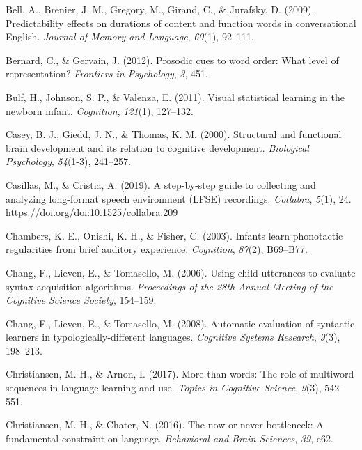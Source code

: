 \documentclass[
  english,
  man,floatsintext]{apa6}
\begin{document}
\leavevmode\hypertarget{ref-bell2009predictability}{}%
Bell, A., Brenier, J. M., Gregory, M., Girand, C., \& Jurafsky, D. (2009). Predictability effects on durations of content and function words in conversational English. \emph{Journal of Memory and Language}, \emph{60}(1), 92--111.

\leavevmode\hypertarget{ref-bernard2012prosodic}{}%
Bernard, C., \& Gervain, J. (2012). Prosodic cues to word order: What level of representation? \emph{Frontiers in Psychology}, \emph{3}, 451.

\leavevmode\hypertarget{ref-bulf2011visual}{}%
Bulf, H., Johnson, S. P., \& Valenza, E. (2011). Visual statistical learning in the newborn infant. \emph{Cognition}, \emph{121}(1), 127--132.

\leavevmode\hypertarget{ref-casey2000structural}{}%
Casey, B. J., Giedd, J. N., \& Thomas, K. M. (2000). Structural and functional brain development and its relation to cognitive development. \emph{Biological Psychology}, \emph{54}(1-3), 241--257.

\leavevmode\hypertarget{ref-casillas2019step}{}%
Casillas, M., \& Cristia, A. (2019). A step-by-step guide to collecting and analyzing long-format speech environment (LFSE) recordings. \emph{Collabra}, \emph{5}(1), 24. \url{https://doi.org/doi:10.1525/collabra.209}

\leavevmode\hypertarget{ref-chambers2003infants}{}%
Chambers, K. E., Onishi, K. H., \& Fisher, C. (2003). Infants learn phonotactic regularities from brief auditory experience. \emph{Cognition}, \emph{87}(2), B69--B77.

\leavevmode\hypertarget{ref-chang2006using}{}%
Chang, F., Lieven, E., \& Tomasello, M. (2006). Using child utterances to evaluate syntax acquisition algorithms. \emph{Proceedings of the 28th Annual Meeting of the Cognitive Science Society}, 154--159.

\leavevmode\hypertarget{ref-chang2008automatic}{}%
Chang, F., Lieven, E., \& Tomasello, M. (2008). Automatic evaluation of syntactic learners in typologically-different languages. \emph{Cognitive Systems Research}, \emph{9}(3), 198--213.

\leavevmode\hypertarget{ref-christiansen2017more}{}%
Christiansen, M. H., \& Arnon, I. (2017). More than words: The role of multiword sequences in language learning and use. \emph{Topics in Cognitive Science}, \emph{9}(3), 542--551.

\leavevmode\hypertarget{ref-christiansen2016now}{}%
Christiansen, M. H., \& Chater, N. (2016). The now-or-never bottleneck: A fundamental constraint on language. \emph{Behavioral and Brain Sciences}, \emph{39}, e62.
\end{document}

